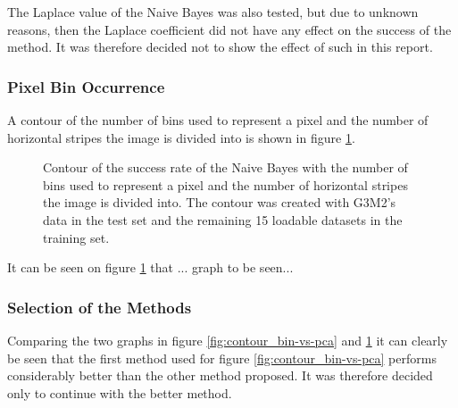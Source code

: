 The Laplace value of the Naive Bayes was also tested, but due to unknown reasons, then the Laplace coefficient did not have any effect on the success of the method.
It was therefore decided not to show the effect of such in this report.

\subsubsection{Pixel Bin Occurrence}
A contour of the number of bins used to represent a pixel and the number of horizontal stripes the image is divided into is shown in figure \ref{fig:contour_bin-vs-div}.

\begin{figure}[H]
\centering
\caption{Contour of the success rate of the Naive Bayes with the number of bins used to represent a pixel and the number of horizontal stripes the image is divided into.
The contour was created with G3M2's data in the test set and the remaining 15 loadable datasets in the training set.}
\label{fig:contour_bin-vs-div}
\end{figure}

It can be seen on figure \ref{fig:contour_bin-vs-div} that ... graph to be seen...



\subsubsection{Selection of the Methods}
Comparing the two graphs in figure \ref{fig:contour_bin-vs-pca} and \ref{fig:contour_bin-vs-div} it can clearly be seen that the first method used for figure \ref{fig:contour_bin-vs-pca} performs considerably better than the other method proposed.
It was therefore decided only to continue with the better method.
